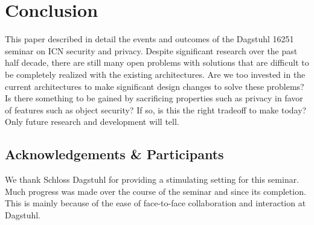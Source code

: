 \documentclass{sig-alternate-10pt}
\begin{document}





\section{Conclusion}
This paper described in detail the events and outcomes of the Dagstuhl 16251
seminar on ICN security and privacy. Despite significant research over the past
half decade, there are still many open problems with solutions that are difficult
to be completely realized with the existing architectures. Are we too invested in the current architectures to make significant design changes to solve these problems? Is there something to be gained by sacrificing properties such as privacy in favor of features such as object security? If so, is this the right tradeoff to make today? Only future research and development will tell.

\subsection*{Acknowledgements \& Participants}
We thank Schloss Dagstuhl for providing a stimulating setting for this seminar. Much
progress was made over the course of the seminar and since its completion. This is mainly
because of the ease of face-to-face collaboration and interaction at Dagstuhl.
\end{document}
